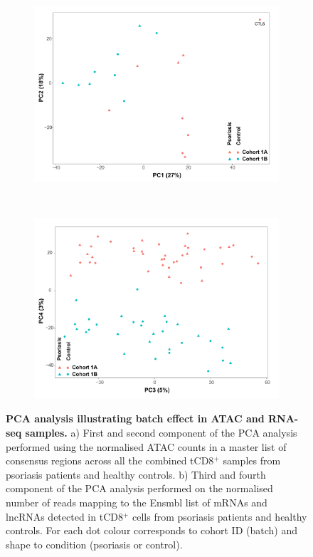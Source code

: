\bigskip
\begin{figure}[htbp]
\centering
\begin{subfigure}[b]{0.50\textwidth}
\centering 
\includegraphics[width=\textwidth]{./Appendix/pdfs/Chapter4/ATAC_CD8_PS_CTL_PCA}
\caption{}
\end{subfigure}
~
\begin{subfigure}[b]{0.50\textwidth} 
\centering
\includegraphics[width=\textwidth]{./Appendix/pdfs/Chapter4/PS_CTL_all_samples_varied_PCA3and4_plot}
\caption{}
\end{subfigure}
\caption[PCA analysis illustrating batch effect in ATAC and RNA-seq samples.]{\textbf{PCA analysis illustrating batch effect in ATAC and RNA-seq samples.} a) First and second component of the PCA analysis performed using the normalised ATAC  counts in a master list of consensus regions across all the combined tCD8$^+$ samples from psoriasis patients and healthy controls. b) Third and fourth component of the PCA analysis performed on the normalised number of reads mapping to the Ensmbl list of mRNAs and lncRNAs detected in tCD8$^+$ cells from psoriasis patients and healthy controls. For each dot colour corresponds to cohort ID (batch) and shape to condition (psoriasis or control).}
\label{figure:ATAC_RNAseq_batch_effect}
\end{figure}

